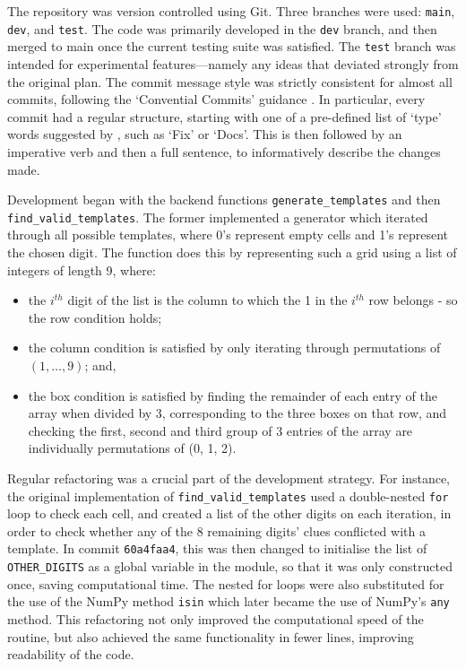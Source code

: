 \documentclass[12pt]{article}
\begin{document}
The repository was version controlled using Git.
Three branches were used: \texttt{main}, \texttt{dev}, and \texttt{test}.
The code was primarily developed in the \texttt{dev} branch, and then merged to main once the current testing suite was satisfied.
The \texttt{test} branch was intended for experimental features---namely any ideas that deviated strongly from the original plan.
The commit message style was strictly consistent for almost all commits, following the `Convential Commits' guidance \cite{ccommits}.
In particular, every commit had a regular structure, starting with one of a pre-defined list of `type' words suggested by \cite{ccommits}, such as `Fix' or `Docs'.
This is then followed by an imperative verb and then a full sentence, to informatively describe the changes made.

Development began with the backend functions \texttt{generate\_templates} and then \texttt{find\_valid\_templates}.
The former implemented a generator which iterated through all possible templates, where 0's represent empty cells and 1's represent the chosen digit.
The function does this by representing such a grid using a list of integers of length 9, where:
\begin{itemize}
    \item the $i^{th}$ digit of the list is the column to which the 1 in the $i^{th}$ row belongs - so the row condition holds;
    \item the column condition is satisfied by only iterating through permutations of $(1,\ldots,9)$; and,
    \item the box condition is satisfied by finding the remainder of each entry of the array when divided by 3, corresponding to the three boxes on that row, and checking the first, second and third group of 3 entries of the array are individually permutations of (0, 1, 2).
\end{itemize}

Regular refactoring was a crucial part of the development strategy.
For instance, the original implementation of \texttt{find\_valid\_templates} used a double-nested \texttt{for} loop to check each cell, and created a list of the other digits on each iteration, in order to check whether any of the 8 remaining digits' clues conflicted with a template.
In commit \texttt{60a4faa4}, this was then changed to initialise the list of \texttt{OTHER\_DIGITS} as a global variable in the module, so that it was only constructed once, saving computational time.
The nested for loops were also substituted for the use of the NumPy method \texttt{isin} which later became the use of NumPy's \texttt{any} method.
This refactoring not only improved the computational speed of the routine, but also achieved the same functionality in fewer lines, improving readability of the code.
\end{document}
